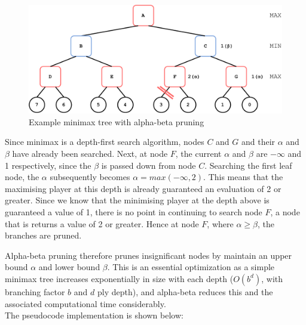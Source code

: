 \documentclass[../main/main.tex]{subfiles}
\begin{document}
\begin{figure}[H]
    \centering
    \includegraphics[width=\columnwidth]{../design/assets/alpha_beta_pruning.pdf}
    \caption{Example minimax tree with alpha-beta pruning}
    \label{fig:alpha-beta}
\end{figure}

Since minimax is a depth-first search algorithm, nodes $C$ and $G$ and their $\alpha$ and $\beta$ have already been searched. Next, at node $F$, the current $\alpha$ and $\beta$ are $-\infty$ and 1 respectively, since the $\beta$ is passed down from node $C$. Searching the first leaf node, the $\alpha$ subsequently becomes $\alpha=max(-\infty,2)$. This means that the maximising player at this depth is already guaranteed an evaluation of 2 or greater. Since we know that the minimising player at the depth above is guaranteed a value of 1, there is no point in continuing to search node $F$, a node that is returns a value of 2 or greater. Hence at node $F$, where $\alpha\geq\beta$, the branches are pruned.

Alpha-beta pruning therefore prunes insignificant nodes by maintain an upper bound $\alpha$ and lower bound $\beta$. This is an essential optimization as a simple minimax tree increases exponentially in size with each depth ($O(b^d)$, with branching factor $b$ and $d$ ply depth), and alpha-beta reduces this and the associated computational time considerably.
\\
The pseudocode implementation is shown below:
\end{document}
